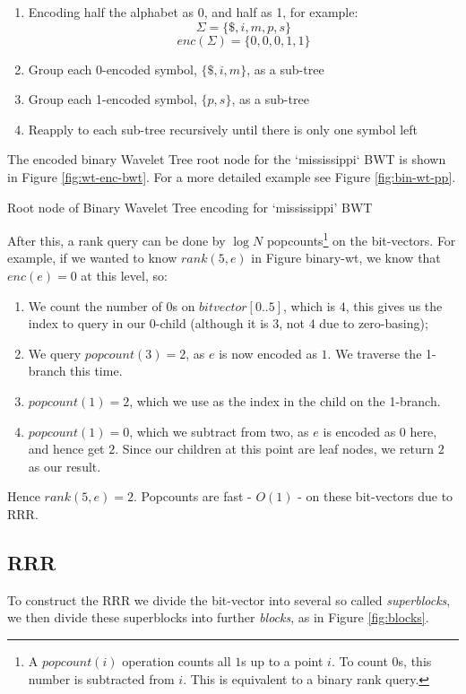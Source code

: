 \begin{enumerate}
    \item
		Encoding half the alphabet as 0, and half as 1, for example:
    		$$\Sigma = \{ \$, i, m, p, s \}$$
			$$enc(\Sigma) = \{ 0, 0, 0, 1, 1 \}$$
    \item
		Group each 0-encoded symbol, $\{ \$, i, m \}$, as a sub-tree
    \item
		Group each 1-encoded symbol, $\{ p, s \}$, as a sub-tree
    \item
		Reapply to each sub-tree recursively until there is only one symbol
    	left
\end{enumerate}

The encoded binary Wavelet Tree root node for the `mississippi` BWT is shown in Figure \ref{fig:wt-enc-bwt}. For a more detailed example see Figure \ref{fig:bin-wt-pp}.


			{Root node of Binary Wavelet Tree encoding for `mississippi' BWT}


After this, a rank query can be done by $\log N$ popcounts\footnote{A
$popcount(i)$ operation counts all $1$s up to a point $i$. To count $0$s, this
number is subtracted from $i$. This is equivalent to a binary rank query.} on the bit-vectors. For example, if we wanted to 
know $rank(5, e)$ in Figure binary-wt, we know that $enc(e) = 0$ at this level, so:

\begin{enumerate}
    \item
		We count the number of $0$s on $bitvector[0..5]$, which is $4$, this
   		gives us the index to query in our 0-child (although it is $3$, not $4$ 
		due to zero-basing);
    \item
		We query $popcount(3) = 2$, as $e$ is now encoded as $1$. We traverse
    	the 1-branch this time.
    \item
		$popcount(1) = 2$, which we use as the index in the child on the
    	1-branch.
    \item
		$popcount(1) = 0$, which we subtract from two, as $e$ is encoded as
    	$0$ here, and hence get $2$. Since our children at this point are leaf
    	nodes, we return $2$ as our result.
\end{enumerate}

Hence $rank(5, e) = 2$. Popcounts are fast - $O(1)$ - on these bit-vectors due
to RRR.

\subsection{RRR}
To construct the RRR we divide the bit-vector into several so called \emph{superblocks}, we then divide these superblocks into further \emph{blocks}, as in Figure \ref{fig:blocks}.


